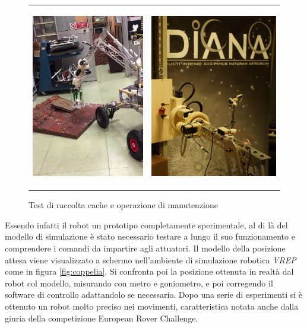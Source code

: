 \documentclass[%
corpo=11pt,
twoside,
 stile=classica,
oldstyle,
greek,%
]{toptesi}
\begin{document}
\begin{figure}
	\centering
	\begin{tabular}{ll}
		\includegraphics[height=8cm,keepaspectratio]{image/cace.png}
		&
		\includegraphics[height=8cm,keepaspectratio]{image/mant.jpg}
	\end{tabular}
	\caption{Test di raccolta cache e operazione di manutenzione}
	\label{fig:test2}
\end{figure}	
 	Essendo infatti il robot un prototipo completamente sperimentale, al di là del modello di simulazione è stato necessario testare a lungo il suo funzionamento e comprendere i comandi da impartire agli attuatori. 
 	Il modello della posizione attesa viene visualizzato a schermo nell'ambiente di simulazione robotica \textit{VREP} come in figura \ref{fig:coppelia}. Si confronta poi la posizione ottenuta in realtà dal robot col modello, misurando con metro e goniometro, e poi corregendo il software di controllo adattandolo se necessario. 
 	Dopo una serie di esperimenti si è ottenuto un robot molto preciso nei movimenti, caratteristica notata anche dalla giuria della competizione European Rover Challenge. 
\end{document}
